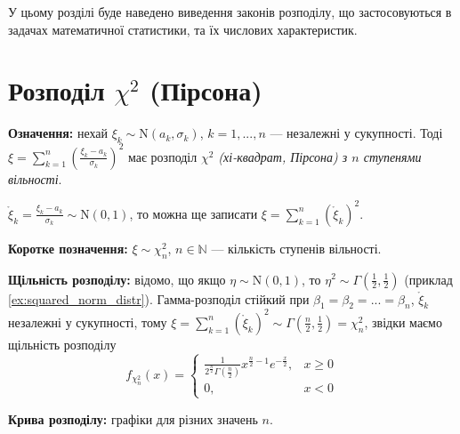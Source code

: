 
У цьому розділі буде наведено виведення законів розподілу, що застосовуються
в задачах математичної статистики, та їх числових характеристик.

\section{Розподіл \texorpdfstring{$\chi^2$}{x2} (Пірсона)}
\noindent\textbf{Означення:} 
    нехай $\xi_k \sim \mathrm{N}(a_k, \sigma_k)$, $k= 1,..., n$ --- незалежні у сукупності.
    Тоді $\xi = \sum\limits_{k=1}^n \left( \frac{\xi_k - a_k}{\sigma_k}\right)^2$ має
    розподіл \emph{$\chi^2$ (хі-квадрат, Пірсона) з $n$ ступенями вільності}.

     $\mathring{\xi}_{k} = \frac{\xi_k - a_k}{\sigma_k} \sim \mathrm{N}(0, 1)$, то можна ще записати
    $\xi = \sum\limits_{k=1}^n (\mathring{\xi}_{k})^2$.

\noindent\textbf{Коротке позначення:} $\xi \sim \chi_n^2$, $n\in\mathbb{N}$ --- кількість ступенів вільності.

\noindent\textbf{Щільність розподілу:}
відомо, що якщо $\eta \sim \mathrm{N}(0, 1)$, то $\eta^2 \sim \Gamma\left(\frac{1}{2}, \frac{1}{2}\right)$ (приклад \ref{ex:squared_norm_distr}).
Гамма-розподіл стійкий при $\beta_1 = \beta_2 = ... = \beta_n$, $\mathring{\xi}_{k}$ незалежні у сукупності,
тому $\xi = \sum\limits_{k=1}^n (\mathring{\xi}_{k})^2 \sim \Gamma\left(\frac{n}{2}, \frac{1}{2}\right) = \chi_n^2$,
звідки маємо щільність розподілу
\begin{equation*}
    f_{\chi_n^2}(x) = \begin{cases}
        \frac{1}{2^{\frac{n}{2}} \Gamma\left(\frac{n}{2}\right)} x^{\frac{n}{2}-1} e^{-\frac{x}{2}}, & x \geq 0 \\
        0, & x < 0
    \end{cases}
\end{equation*}

\noindent \textbf{Крива розподілу:} графіки для різних значень $n$.
\begin{center}
\end{center}

